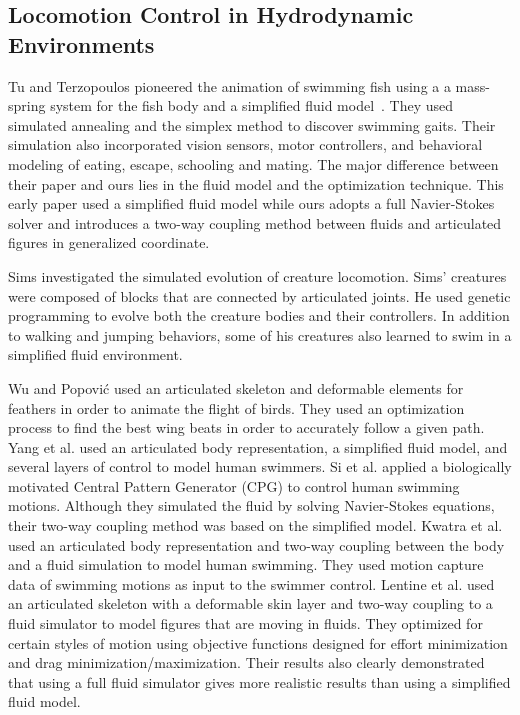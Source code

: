 \subsection{Locomotion Control in Hydrodynamic Environments}

Tu and Terzopoulos pioneered the animation of swimming fish using a a
mass-spring system for the fish body and a simplified fluid
model~\cite{tu1994artificial,terzopoulos1994artificial,Grzeszczuk95automatedlearning}. They used simulated annealing and the simplex method to discover swimming gaits. Their simulation also incorporated vision sensors, motor controllers, and behavioral modeling
of eating, escape, schooling and mating.  The
major difference between their paper and ours lies in the fluid model and the optimization technique. This early paper used a
simplified fluid model while ours adopts a full Navier-Stokes solver and introduces a two-way coupling method between
fluids and articulated figures in generalized coordinate.

Sims \cite{sims1994creatures} investigated the simulated evolution of
creature locomotion.  Sims' creatures were composed
of blocks that are connected by articulated joints. He used genetic
programming to evolve both the creature bodies and their controllers.  In
addition to walking and jumping behaviors, some of his creatures also
learned to swim in a simplified fluid environment.

Wu and Popovi\'{c} \cite{wu2003realistic} used an articulated skeleton and deformable elements for
feathers in order to animate the flight of birds.
They used an optimization process to find the best wing beats in order to
accurately follow a given path.  Yang et al. \cite{yang2004layered} used an articulated body
representation, a simplified fluid model, and several layers of control to
model human swimmers. Si et al. \cite{Si:2014} applied a biologically motivated Central Pattern Generator (CPG) to control human swimming motions. Although they simulated the fluid by solving Navier-Stokes equations, their two-way coupling method was based on the simplified model. Kwatra et al. \cite{kwatra2009fluid} used an
articulated body representation and two-way coupling between the body and a
fluid simulation to model human swimming.  They used
motion capture data of swimming motions as input to the swimmer control.
Lentine et al. \cite{lentine2010creature} used an articulated skeleton with a deformable skin layer and
two-way coupling to a fluid simulator to model figures that are moving in
fluids.  They optimized for certain styles of
motion using objective functions designed for effort minimization and drag
minimization/maximization.  Their results also clearly demonstrated that
using a full fluid simulator gives more realistic results than using a
simplified fluid model.


